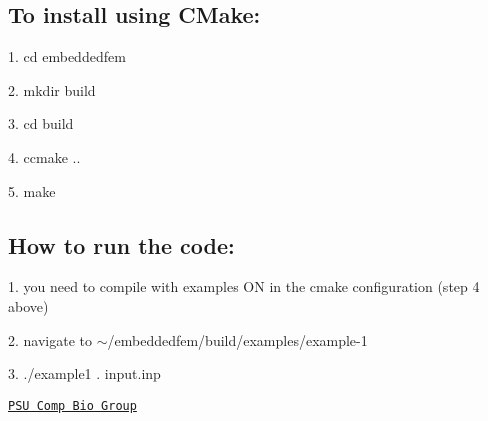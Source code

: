 \subsection*{To install using C\+Make\+:}

1. cd embeddedfem

2. mkdir build

3. cd build

4. ccmake ..

5. make

\subsection*{How to run the code\+:}

1. you need to compile with examples ON in the cmake configuration (step 4 above)

2. navigate to $\sim$/embeddedfem/build/examples/example-\/1

3. ./example1 . input.\+inp

\href{http://www.mne.psu.edu/compbio}{\tt P\+SU Comp Bio Group}  